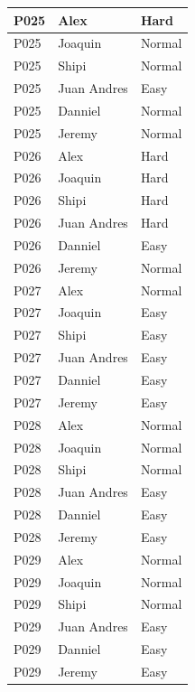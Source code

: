 \begin{longtable}{
    |
    >{\centering\arraybackslash}p{4.5cm}|
    >{\centering\arraybackslash}p{4.5cm}|
    >{\centering\arraybackslash}p{4.5cm}|
}
    P025 & Alex        & Hard \\ \hline
    P025 & Joaquin     & Normal \\ \hline
    P025 & Shipi       & Normal \\ \hline
    P025 & Juan Andres & Easy \\ \hline
    P025 & Danniel     & Normal \\ \hline
    P025 & Jeremy      & Normal \\ \hline

    P026 & Alex        & Hard \\ \hline
    P026 & Joaquin     & Hard \\ \hline
    P026 & Shipi       & Hard \\ \hline
    P026 & Juan Andres & Hard \\ \hline
    P026 & Danniel     & Easy \\ \hline
    P026 & Jeremy      & Normal \\ \hline

    P027 & Alex        & Normal \\ \hline
    P027 & Joaquin     & Easy \\ \hline
    P027 & Shipi       & Easy \\ \hline
    P027 & Juan Andres & Easy \\ \hline
    P027 & Danniel     & Easy \\ \hline
    P027 & Jeremy      & Easy \\ \hline

    P028 & Alex        & Normal \\ \hline
    P028 & Joaquin     & Normal \\ \hline
    P028 & Shipi       & Normal \\ \hline
    P028 & Juan Andres & Easy \\ \hline
    P028 & Danniel     & Easy \\ \hline
    P028 & Jeremy      & Easy \\ \hline

    P029 & Alex        & Normal \\ \hline
    P029 & Joaquin     & Normal \\ \hline
    P029 & Shipi       & Normal \\ \hline
    P029 & Juan Andres & Easy \\ \hline
    P029 & Danniel     & Easy \\ \hline
    P029 & Jeremy      & Easy \\ \hline


\end{longtable}
